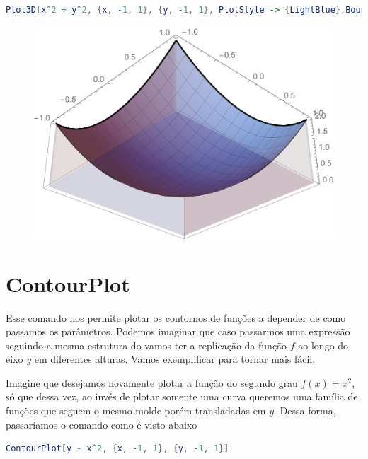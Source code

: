 \documentclass[a4paper, 12pt]{article}
\begin{document}
\begin{itemize}
\begin{lstlisting}[language=Mathematica]
Plot3D[x^2 + y^2, {x, -1, 1}, {y, -1, 1}, PlotStyle -> {LightBlue},BoundaryStyle -> {Thick, Blue}, Filling -> Bottom,FillingStyle -> {Opacity[.2]}]
\end{lstlisting}

			\begin{figure}[!h]
				\centering
				\includegraphics[scale=.5]{images/PlotStyle3d1}
			\end{figure}
	\end{itemize}

	\section{ContourPlot}
		Esse comando nos permite plotar os contornos de funções a depender de como passamos os parâmetros. Podemos imaginar que caso passarmos uma expressão seguindo a mesma estrutura do  vamos ter a replicação da função $f$ ao longo do eixo $y$ em diferentes alturas. Vamos exemplificar para tornar mais fácil.
		
		Imagine que desejamos novamente plotar a função do segundo grau $f(x)=x^{2}$, só que dessa vez, ao invés de plotar somente uma curva queremos uma família de funções que seguem o mesmo molde porém transladadas em $y$. Dessa forma, passaríamos o comando como é visto abaixo 
		
\begin{lstlisting}[language=Mathematica]
ContourPlot[y - x^2, {x, -1, 1}, {y, -1, 1}]
\end{lstlisting}
\end{document}
